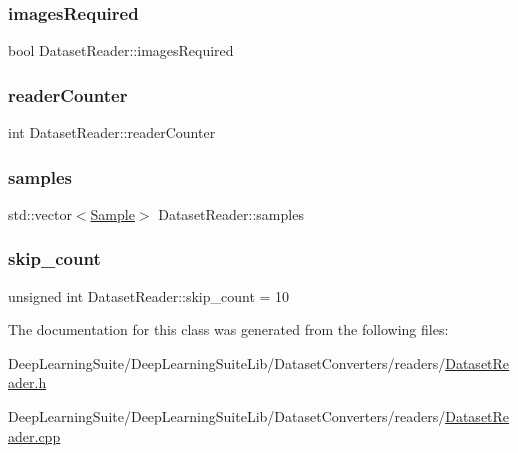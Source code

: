 \subsubsection{\texorpdfstring{images\+Required}{imagesRequired}}
{\footnotesize\ttfamily bool Dataset\+Reader\+::images\+Required\hspace{0.3cm}{\ttfamily [protected]}}

\mbox{\label{class_dataset_reader_af0fd759568c5db7187d19bae8ebe1b6c}} 
\subsubsection{\texorpdfstring{reader\+Counter}{readerCounter}}
{\footnotesize\ttfamily int Dataset\+Reader\+::reader\+Counter\hspace{0.3cm}{\ttfamily [protected]}}

\mbox{\label{class_dataset_reader_adeafe74d71d96205e2920f76d3fc6a72}} 
\subsubsection{\texorpdfstring{samples}{samples}}
{\footnotesize\ttfamily std\+::vector$<$\hyperlink{struct_sample}{Sample}$>$ Dataset\+Reader\+::samples\hspace{0.3cm}{\ttfamily [protected]}}

\mbox{\label{class_dataset_reader_aae9a49629ae536c02b726e52a9def4ee}} 
\subsubsection{\texorpdfstring{skip\+\_\+count}{skip\_count}}
{\footnotesize\ttfamily unsigned int Dataset\+Reader\+::skip\+\_\+count = 10\hspace{0.3cm}{\ttfamily [protected]}}



The documentation for this class was generated from the following files\+:\begin{DoxyCompactItemize}
\item 
Deep\+Learning\+Suite/\+Deep\+Learning\+Suite\+Lib/\+Dataset\+Converters/readers/\hyperlink{_dataset_reader_8h}{Dataset\+Reader.\+h}\item 
Deep\+Learning\+Suite/\+Deep\+Learning\+Suite\+Lib/\+Dataset\+Converters/readers/\hyperlink{_dataset_reader_8cpp}{Dataset\+Reader.\+cpp}\end{DoxyCompactItemize}
